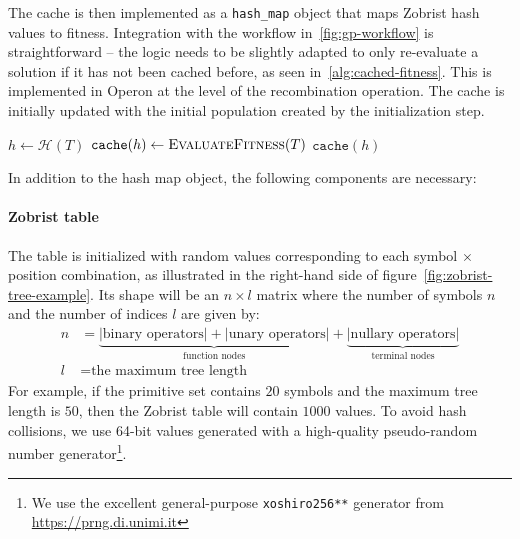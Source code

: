 \documentclass[openacc]{rstransa}%
\begin{document}
The cache is then implemented as a \texttt{hash\_map} object that maps Zobrist hash values to fitness. Integration with the workflow in~\autoref{fig:gp-workflow} is straightforward -- the logic needs to be slightly adapted to only re-evaluate a solution if it has not been cached before, as seen in~\autoref{alg:cached-fitness}. This is implemented in Operon at the level of the recombination operation. The cache is initially updated with the initial population created by the initialization step.

\begin{algorithm}
    \begin{algorithmic}[1]
            \State $h \gets \mathcal{H}(T)$
                \State $\texttt{cache}(h) \gets \textsc{EvaluateFitness}(T)$
            \EndIf
            \State \Return $\texttt{cache}(h)$
        \EndProcedure
    \end{algorithmic}
    \caption{Cached fitness evaluation}
    \label{alg:cached-fitness}
\end{algorithm}


In addition to the hash map object, the  following components are necessary:

\paragraph{Zobrist table} The table is initialized with random values corresponding to each symbol $\times$ position combination, as illustrated in the right-hand side of figure~\autoref{fig:zobrist-tree-example}.
%
Its shape will be an $n\times l$ matrix where the number of symbols $n$ and the number of indices $l$ are given by:
\begin{align}
    n &= \underbrace{|\text{binary operators}| + |\text{unary operators|}}_\text{function nodes} + \underbrace{|\text{nullary operators}|}_\text{terminal nodes}\\
    l &= \text{the maximum tree length}
\end{align}
For example, if the primitive set contains $20$ symbols and the maximum tree length is $50$, then the Zobrist table will contain $1000$ values. To avoid hash collisions, we use 64-bit values generated with a high-quality pseudo-random number generator\footnote{We use the excellent general-purpose \texttt{xoshiro256**} generator from \url{https://prng.di.unimi.it}}\cite{blackman2021}.
\end{document}
